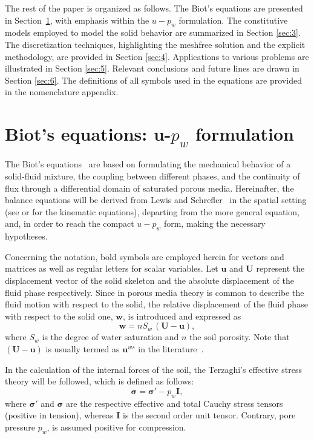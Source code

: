 \documentclass[twocolumn]{svjour3}          %
\begin{document}
The rest of the paper is organized as follows. The Biot's equations are presented in Section~\ref{sec:2}, with emphasis within the $u-p_w$ formulation. The constitutive models employed to model the solid behavior are summarized in Section \ref{sec:3}. The discretization techniques, highlighting the meshfree solution and the explicit methodology, are provided in Section \ref{sec:4}. Applications to various problems are illustrated in Section \ref{sec:5}. Relevant conclusions and future lines are drawn in Section \ref{sec:6}. The definitions of all symbols used in the equations are provided in the nomenclature appendix.    


\section{Biot's equations: u-$p_w$ formulation}
\label{sec:2}

The Biot's equations~\cite{Biot1956} are based on formulating the mechanical behavior of a solid-fluid mixture, the coupling between different phases, and the continuity of flux through a differential domain of saturated porous media. Hereinafter, the balance equations will be derived from Lewis and Schrefler~\cite{LewisSchrefler98} in the spatial setting (see \cite{LewisSchrefler98} or \cite{Sanavia:02b,Sanavia:02} for the kinematic equations), departing from the more general equation, and, in order to reach the compact $u-p_w$ form, making the necessary hypotheses.

Concerning the notation, bold symbols are employed herein for vectors and matrices as well as regular letters for scalar variables.  Let   $\boldsymbol{u}$ and   $\boldsymbol{U}$ represent  the displacement vector of the solid skeleton   and the absolute displacement of the fluid phase respectively. Since in porous media theory is common to describe the fluid motion with respect to the solid, the
relative displacement of the fluid phase with respect to the solid one, $\boldsymbol{w}$, is introduced and expressed as~\cite{LopezQuerol2008}
\begin{equation}\label{eq_uw1}
\boldsymbol{ w }=n S_w\, \boldsymbol{  \left(U-u\right) },
\end{equation}
where $S_w$ is the degree of water saturation and $n$ the soil porosity.  Note that $\boldsymbol{  \left(U-u\right) }$ is usually  termed as $\boldsymbol{u}^{ws}$ in the literature~\cite{LewisSchrefler98}. 

In the calculation of the internal forces of the soil, the Terzaghi's effective stress theory  \cite{Terzaghi1925} will be followed, which is defined as follows:
\begin{equation}\label{eq_uw5}
 \boldsymbol{ \sigma} =\boldsymbol{ \sigma'} - p_{w}\textbf{I},
\end{equation}
where $ \boldsymbol{ \sigma'} $ and  $\boldsymbol{ \sigma}$ are the respective effective and total Cauchy stress tensors (positive in tension), whereas $\textbf{I}$ is the second order unit tensor.  Contrary, pore pressure $p_w$, is assumed positive for compression.
\end{document}
